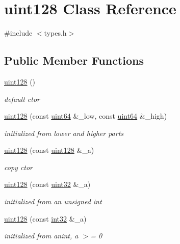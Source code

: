 \hypertarget{classuint128}{}\section{uint128 Class Reference}
\label{classuint128}


{\ttfamily \#include $<$types.\+h$>$}

\subsection*{Public Member Functions}
\begin{DoxyCompactItemize}
\item 
\hyperlink{classuint128_abe535f8ff596b02234d94ab4c8d40933}{uint128} ()
\begin{DoxyCompactList}\small\item\em default ctor \end{DoxyCompactList}\item 
\hyperlink{classuint128_a2b3acd15568d628cffb98f5c58f17ea9}{uint128} (const \hyperlink{types_8h_a60e8696a4678cd348e991a1f172e53f7}{uint64} \&\+\_\+low, const \hyperlink{types_8h_a60e8696a4678cd348e991a1f172e53f7}{uint64} \&\+\_\+high)
\begin{DoxyCompactList}\small\item\em initialized from lower and higher parts \end{DoxyCompactList}\item 
\hyperlink{classuint128_a228d418fd9f623a4ee7120a7a53e0797}{uint128} (const \hyperlink{classuint128}{uint128} \&\+\_\+a)
\begin{DoxyCompactList}\small\item\em copy ctor \end{DoxyCompactList}\item 
\hyperlink{classuint128_a5820b53a7880e5caf28057ea8bddff4b}{uint128} (const \hyperlink{types_8h_a8f95e75e58492e87412191fabadd8ca8}{uint32} \&\+\_\+a)
\begin{DoxyCompactList}\small\item\em initialized from an unsigned int \end{DoxyCompactList}\item 
\hyperlink{classuint128_af1cf2b32a813dae00ec27cfae5fabf1a}{uint128} (const \hyperlink{types_8h_a3d594eb72953c94a18a03d929ebd9167}{int32} \&\+\_\+a)
\begin{DoxyCompactList}\small\item\em initialized from anint, a $>$= 0 \end{DoxyCompactList}\item 

\end{DoxyCompactItemize}
